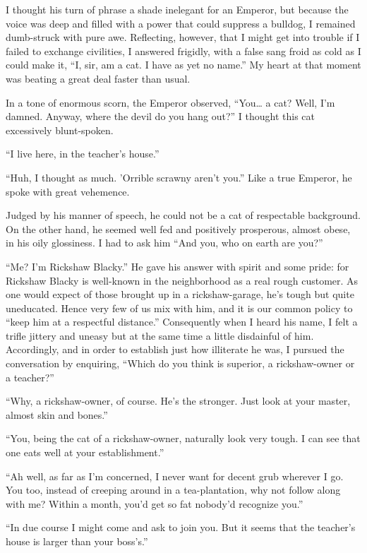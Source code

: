 \documentclass{book}
\begin{document}
I thought his turn of phrase a shade inelegant for an Emperor, but
because the voice was deep and filled with a power that could suppress a
bulldog, I remained dumb-struck with pure awe. Reflecting, however, that
I might get into trouble if I failed to exchange civilities, I answered
frigidly, with a false sang froid as cold as I could make it, ``I, sir,
am a cat. I have as yet no name.'' My heart at that moment was beating a
great deal faster than usual.

In a tone of enormous scorn, the Emperor observed, ``You\ldots{} a cat?
Well, I'm damned. Anyway, where the devil do you hang out?'' I thought
this cat excessively blunt-spoken.

``I live here, in the teacher's house.''

``Huh, I thought as much. 'Orrible scrawny aren't you.'' Like a true
Emperor, he spoke with great vehemence.

Judged by his manner of speech, he could not be a cat of respectable
background. On the other hand, he seemed well fed and positively
prosperous, almost obese, in his oily glossiness. I had to ask him ``And
you, who on earth are you?''

``Me? I'm Rickshaw Blacky.'' He gave his answer with spirit and some
pride: for Rickshaw Blacky is well-known in the neighborhood as a real
rough customer. As one would expect of those brought up in a
rickshaw-garage, he's tough but quite uneducated. Hence very few of us
mix with him, and it is our common policy to ``keep him at a respectful
distance.'' Consequently when I heard his name, I felt a trifle jittery
and uneasy but at the same time a little disdainful of him. Accordingly,
and in order to establish just how illiterate he was, I pursued the
conversation by enquiring, ``Which do you think is superior, a
rickshaw-owner or a teacher?''

``Why, a rickshaw-owner, of course. He's the stronger. Just look at your
master, almost skin and bones.''

``You, being the cat of a rickshaw-owner, naturally look very tough. I
can see that one eats well at your establishment.''

``Ah well, as far as I'm concerned, I never want for decent grub
wherever I go. You too, instead of creeping around in a tea-plantation,
why not follow along with me? Within a month, you'd get so fat nobody'd
recognize you.''

``In due course I might come and ask to join you. But it seems that the
teacher's house is larger than your boss's.''
\end{document}
